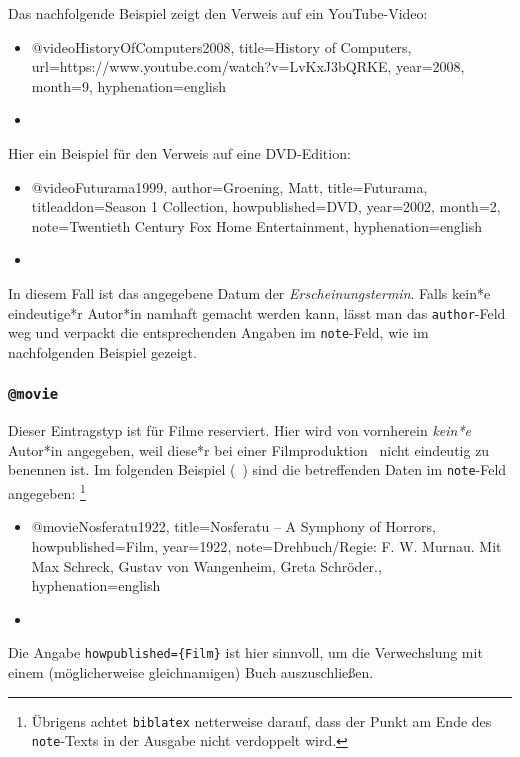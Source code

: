 Das nachfolgende Beispiel zeigt den Verweis auf ein YouTube-Video:
%
\begin{itemize}
\item[]
\begin{GenericCode}[numbers=none]
@video{HistoryOfComputers2008,
	title={History of Computers},
	url={https://www.youtube.com/watch?v=LvKxJ3bQRKE},
	year={2008},
	month={9},
	hyphenation={english}
}
\end{GenericCode}
\item[\cite{HistoryOfComputers2008}] 
\end{itemize}

\noindent
Hier ein Beispiel für den Verweis auf eine DVD-Edition:
%
\begin{itemize}
\item[] 
\begin{GenericCode}[numbers=none]
@video{Futurama1999,
  author={Groening, Matt},
  title={Futurama},
  titleaddon={Season 1 Collection},
  howpublished={DVD},
  year={2002},
  month={2},
  note={Twentieth Century Fox Home Entertainment},
  hyphenation={english}
 }
\end{GenericCode}
\item[\cite{Futurama1999}] 
\end{itemize}
%
In diesem Fall ist das angegebene Datum der \emph{Erscheinungstermin}. 
Falls kein*e eindeutige*r Autor*in namhaft gemacht werden kann, lässt man das
\texttt{author}-Feld weg und verpackt die entsprechenden Angaben im
\texttt{note}-Feld, wie im nachfolgenden Beispiel gezeigt.




\subsubsection{\texttt{@movie}}
\label{sec:@movie}
Dieser Eintragstyp ist für Filme reserviert. 
Hier wird von vornherein \emph{kein*e} Autor*in angegeben, weil diese*r bei 
einer Filmproduktion \ia\ nicht eindeutig zu benennen ist. 
Im folgenden Beispiel (\sa\ \cite{Psycho1960}) sind die betreffenden Daten 
im \texttt{note}-Feld angegeben:%
\footnote{Übrigens achtet \texttt{biblatex} netterweise darauf, dass der  
Punkt am Ende des \texttt{note}-Texts in der Ausgabe nicht verdoppelt wird.}
%
\begin{itemize}
\item[] 
\begin{GenericCode}[numbers=none]
@movie{Nosferatu1922,
  title={Nosferatu -- A Symphony of Horrors},
  howpublished={Film},
  year={1922},
  note={Drehbuch/Regie: F. W. Murnau. Mit Max Schreck, Gustav von Wangenheim, Greta Schröder.},
  hyphenation={english}
}
\end{GenericCode}
\item[\cite{Nosferatu1922}] 
\end{itemize}
%
Die Angabe \verb!howpublished={Film}! ist hier sinnvoll, um die Verwechslung
mit einem (möglicherweise gleichnamigen) Buch auszuschließen.



